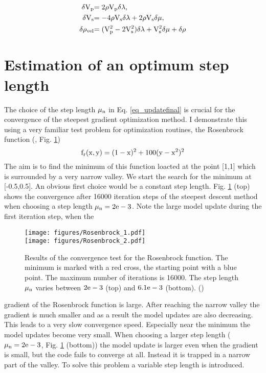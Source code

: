 \begin{equation}
\begin{split}
\rm{\delta V_p} & \rm{= 2 \rho V_p \delta \lambda,}\\
\rm{\delta V_s} & \rm{= - 4 \rho V_s \delta \lambda + 2 \rho V_s \delta \mu,}\\
\rm{\delta \rho_{vel}} & \rm{= (V_p^2 - 2 V_s^2) \delta \lambda + V_s^2 \delta \mu + \delta \rho}\\
\end{split}
\label{2:54}
\end{equation}

\section{Estimation of an optimum step length}\label{optimum_step_length} %
The choice of the step length $\rm{\mu_n}$ in Eq. \ref{eq_updatefinal} is crucial for the convergence of the steepest gradient optimization method. I demonstrate this using a very familiar test problem for optimization routines, the Rosenbrock function (\cite{rosenbrock:60}, Fig. \ref{Rosenbrock_constant})
\begin{equation}
\rm{f_r(x,y) = (1-x)^2 + 100 (y-x^2)^2}
\label{rosenbrock}
\end{equation}
The aim is to find the minimum of this function loacted at the point [1,1] which is surrounded by a very narrow valley. We start the search for the minimum at [-0.5,0.5]. An obvious first choice would be a constant step length. Fig. \ref{Rosenbrock_constant} (top) shows the convergence after 16000 iteration steps of the steepest descent method when choosing a step length $\rm{\mu_n=2e-3}$. Note the large model update during the first iteration step, when the 
\begin{figure}
\begin{center}
\texttt{[image: figures/Rosenbrock\_1.pdf]}\\
\texttt{[image: figures/Rosenbrock\_2.pdf]}\\
\caption{Results of the convergence test for the Rosenbrock function. The minimum is marked with a red cross, the starting point with a blue point. The maximum number of iterations is 16000. The step length $\rm{\mu_n}$ varies between $\rm{2e-3}$ (top) and $\rm{6.1e-3}$ (bottom). (\cite{koehn:11})}
\label{Rosenbrock_constant}
\end{center}
\end{figure}
gradient of the Rosenbrock function is large. After reaching the narrow valley the gradient is much smaller and as a result the model updates are also decreasing. This leads to a very slow convergence speed. Especially near the minimum the model updates become very small. When choosing a larger step length ($\rm{\mu_n=2e-3}$, Fig. \ref{Rosenbrock_constant} (bottom)) the model update is larger even when the gradient is small, but the code fails to converge at all. Instead it is trapped in a narrow part of the valley. To solve this problem a variable step length is introduced.
